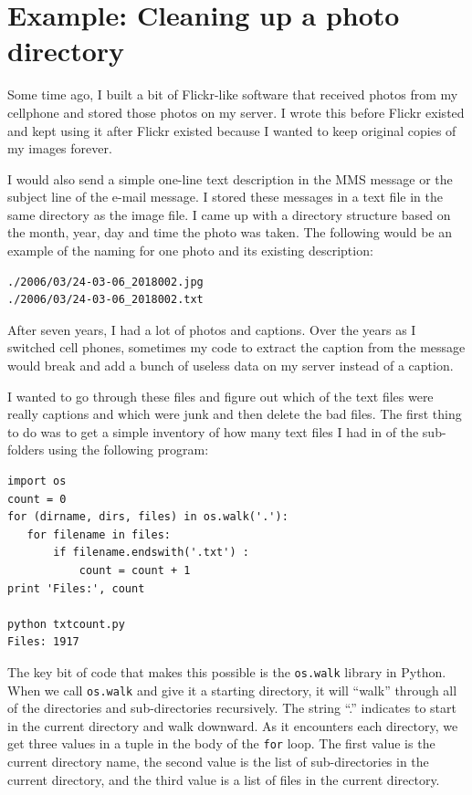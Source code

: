 \documentclass[10pt]{book}
\begin{document}
\section{Example: Cleaning up a photo directory}

Some time ago, I built a bit of Flickr-like software that 
received photos from my cellphone and stored those photos
on my server.  I wrote this before Flickr existed and kept 
using it after Flickr existed because
I wanted to keep original copies of my images forever.

I would also send a simple one-line text description in the MMS message
or the subject line of the e-mail message.  I stored these messages
in a text file in the same directory as the image file.   I came up 
with a directory structure based on the month, year, day and time the 
photo was taken.   The following would be an example of the naming for 
one photo and its existing description:

\beforeverb
\begin{verbatim}
./2006/03/24-03-06_2018002.jpg
./2006/03/24-03-06_2018002.txt
\end{verbatim}
\afterverb
%
After seven years, I had a lot of photos and captions.  Over the years
as I switched cell phones, sometimes my code to extract the caption from the message 
would break and add a bunch of useless data on my server instead of a caption.  

I wanted to go through these files and figure out which of the 
text files were really captions and which were junk and then delete the bad
files.  The first thing to do was to get a simple inventory of 
how many text files I had in of the sub-folders
using the following program:

\beforeverb
\begin{verbatim}
import os
count = 0
for (dirname, dirs, files) in os.walk('.'):
   for filename in files:
       if filename.endswith('.txt') :
           count = count + 1
print 'Files:', count

python txtcount.py
Files: 1917
\end{verbatim}
\afterverb
%
The key bit of code that makes this possible is the {\tt os.walk}
library in Python.  When we call {\tt os.walk} and give it a starting
directory, it will ``walk'' through all of the directories 
and sub-directories recursively.   The string ``.'' indicates
to start in the current directory and walk downward.
As it encounters each directory,
we get three values in a tuple in the body of the {\tt for} loop.  
The first value is the current
directory name, the second value is the list of sub-directories 
in the current directory, and the third value is a list of files
in the current directory.
\end{document}
